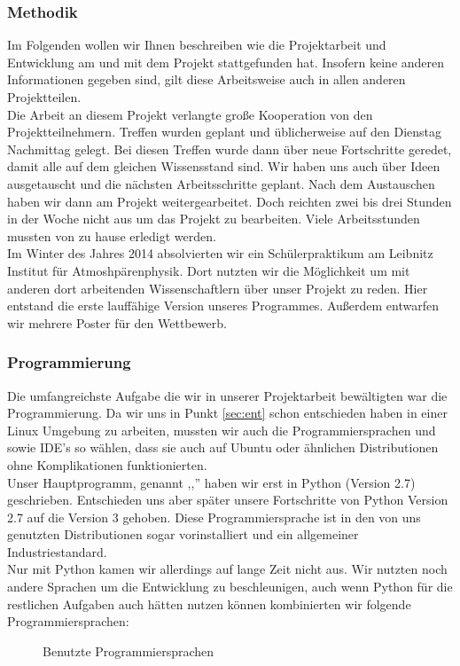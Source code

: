 \subsubsection{Methodik} %
Im Folgenden wollen wir Ihnen beschreiben wie die Projektarbeit und Entwicklung am und mit dem Projekt stattgefunden hat.
Insofern keine anderen Informationen gegeben sind, gilt diese Arbeitsweise auch in allen anderen Projektteilen. \\
Die Arbeit an diesem Projekt verlangte große Kooperation von den Projektteilnehmern.
Treffen wurden geplant und üblicherweise auf den Dienstag Nachmittag gelegt.
Bei diesen Treffen wurde dann über neue Fortschritte geredet, damit alle auf dem gleichen Wissensstand sind.
Wir haben uns auch über Ideen ausgetauscht und die nächsten Arbeitsschritte geplant.
Nach dem Austauschen haben wir dann am Projekt weitergearbeitet.
Doch reichten zwei bis drei Stunden in der Woche nicht aus um das Projekt zu bearbeiten.
Viele Arbeitsstunden mussten von zu hause erledigt werden.\\
Im Winter des Jahres 2014 absolvierten wir ein Schülerpraktikum am Leibnitz Institut für Atmoshpärenphysik. %
Dort nutzten wir die Möglichkeit um mit anderen dort arbeitenden Wissenschaftlern über unser Projekt zu reden.
Hier entstand die erste lauffähige Version unseres Programmes.
Außerdem entwarfen wir mehrere Poster für den \jf Wettbewerb.

\subsubsection{Programmierung}
Die umfangreichste Aufgabe die wir in unserer Projektarbeit bewältigten war die Programmierung.
Da wir uns in Punkt \ref{sec:ent}  schon entschieden haben in einer Linux Umgebung zu arbeiten,
mussten wir auch die Programmiersprachen und sowie IDE's so wählen,
dass sie auch auf Ubuntu oder ähnlichen Distributionen ohne Komplikationen funktionierten.\\
Unser Hauptprogramm, genannt ,,\vs '' haben wir erst in Python (Version 2.7) \cite{python27} geschrieben.
Entschieden uns aber später unsere Fortschritte von Python Version 2.7 auf die Version 3 gehoben.
Diese Programmiersprache ist in den von uns genutzten Distributionen sogar vorinstalliert und ein allgemeiner Industriestandard.\\
Nur mit Python kamen wir allerdings auf lange Zeit nicht aus.
Wir nutzten noch andere Sprachen um die Entwicklung zu beschleunigen,
auch wenn Python für die restlichen Aufgaben auch hätten nutzen können kombinierten wir folgende Programmiersprachen:
\begin{figure}[H]

\label{fig:pyvi}
\caption{Benutzte Programmiersprachen}
\end{figure}

